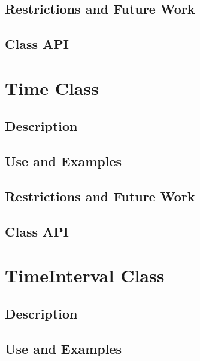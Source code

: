 \documentclass[english]{article}
\begin{document}
\subsection{Restrictions and Future Work}

%
%
\subsection{Class API}

\newpage
\section{Time Class}
\subsection{Description}

\subsection{Use and Examples}


\subsection{Restrictions and Future Work}

\subsection{Class API}

\newpage
\section{TimeInterval Class}
\subsection{Description}

\subsection{Use and Examples}


\end{document}
